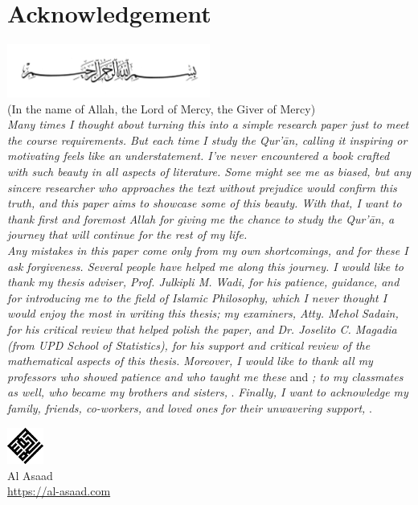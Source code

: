 \chapter*{Acknowledgement}
{\centering
\includegraphics[width=0.5\textwidth]{img/bismillah.jpg}\\[-.2cm]
(In the name of Allah, the Lord of Mercy, the Giver of Mercy)\\[0.6cm]
}\textit{Many times I thought about turning this into a simple research paper just to meet the course requirements. But each time I study the Qur'\=an, calling it inspiring or motivating feels like an understatement. I've never encountered a book crafted with such beauty in all aspects of literature. Some might see me as biased, but any sincere researcher who approaches the text without prejudice would confirm this truth, and this paper aims to showcase some of this beauty. With that, I want to thank first and foremost Allah \textrm{} for giving me the chance to study the Qur'\=an, a journey that will continue for the rest of my life.}\\[0.3cm]
\indent\textit{Any mistakes in this paper come only from my own shortcomings, and for these I ask forgiveness. Several people have helped me along this journey. I would like to thank my thesis adviser, Prof. Julkipli M. Wadi, for his patience, guidance, and for introducing me to the field of Islamic Philosophy, which I never thought I would enjoy the most in writing this thesis; my examiners, Atty. Mehol Sadain, for his critical review that helped polish the paper, and Dr. Joselito C. Magadia (from UPD School of Statistics), for his support and critical review of the mathematical aspects of this thesis. Moreover, I would like to thank all my professors who showed patience and who taught me these}  and \textit{; to my classmates as well, who became my brothers and sisters,} . \textit{Finally, I want to acknowledge my family, friends, co-workers, and loved ones for their unwavering support,} .\\
\begin{center}
    \includegraphics[width=0.09\textwidth]{img/alasaad-logo.png}\\
    Al Asaad\\
    \url{https://al-asaad.com}\\[-0.5cm]
\end{center}
